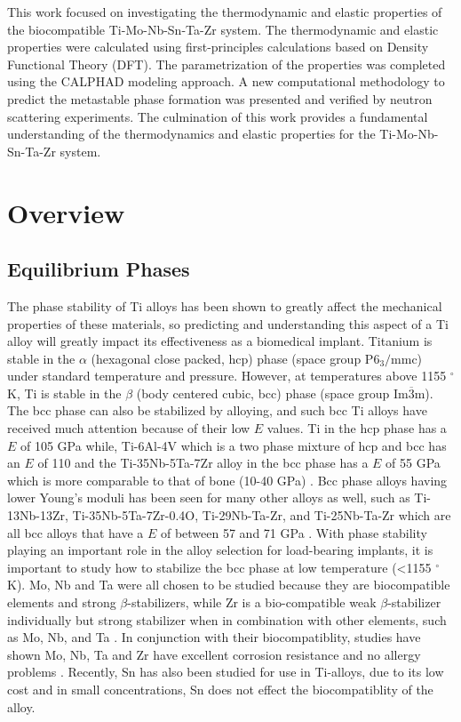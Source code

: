 This work focused on investigating the thermodynamic and elastic properties of the biocompatible Ti-Mo-Nb-Sn-Ta-Zr system. The thermodynamic and elastic properties were calculated using first-principles calculations based on Density Functional Theory (DFT). The parametrization of the properties was completed using the CALPHAD modeling approach. A new computational methodology to predict the metastable phase formation was presented and verified by neutron scattering experiments. The culmination of this work provides a fundamental understanding of the thermodynamics and elastic properties for the Ti-Mo-Nb-Sn-Ta-Zr system. 


\section{Overview}

\subsection{Equilibrium Phases}

The phase stability of Ti alloys has been shown to greatly affect the mechanical properties of these materials, so predicting and understanding this aspect of a Ti alloy will greatly impact its effectiveness as a biomedical implant. Titanium is stable in the $\alpha$ (hexagonal close packed, hcp) phase (space group P$6_{3}/$mmc) under standard temperature and pressure. However, at temperatures above 1155 $^{\circ}$K, Ti is stable in the $\beta$ (body centered cubic, bcc) phase (space group Im$\overline{3}$m). The bcc phase can also be stabilized by alloying, and such bcc Ti alloys have received much attention because of their low $E$ values. Ti in the hcp phase has a $E$ of 105 GPa while, Ti-6Al-4V which is a two phase mixture of hcp and bcc has an $E$ of 110 and the Ti-35Nb-5Ta-7Zr alloy in the bcc phase has a $E$ of 55 GPa which is more comparable to that of bone (10-40 GPa) \cite{Long1998a,Jain2013,Antolin2012,Mei2011,Brailovski2011b}. Bcc phase alloys having lower Young's moduli has been seen for many other alloys as well, such as Ti-13Nb-13Zr, Ti-35Nb-5Ta-7Zr-0.4O, Ti-29Nb-Ta-Zr, and Ti-25Nb-Ta-Zr which are all bcc alloys that have a $E$ of between 57 and 71 GPa \cite{Long1998a,Tane2008a,Tane2010a}. With phase stability playing an important role in the alloy selection for load-bearing implants, it is important to study how to stabilize the bcc phase at low temperature (<1155 $^{\circ}$K). Mo, Nb and Ta were all chosen to be studied because they are biocompatible elements and strong $\beta$-stabilizers, while Zr is a bio-compatible weak $\beta$-stabilizer individually but strong stabilizer when in combination with other elements, such as Mo, Nb, and Ta \cite{Long1998a}. In conjunction with their biocompatiblity, studies have shown Mo, Nb, Ta and Zr have excellent corrosion resistance and no allergy problems \cite{Tane2008a}. Recently, Sn has also been studied for use in Ti-alloys, due to its low cost \cite{Niinomi2012} and in small concentrations, Sn does not effect the biocompatiblity of the alloy. 

